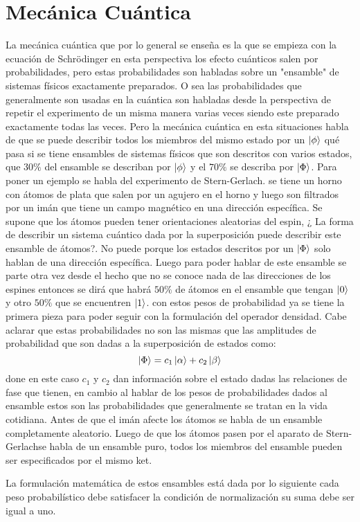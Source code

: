 \section{Mecánica Cuántica}
La mecánica cuántica que por lo general se enseña es la que se empieza con la ecuación de Schrödinger en esta perspectiva los efecto cuánticos salen por probabilidades, pero estas probabilidades son habladas sobre un "ensamble" de sistemas físicos exactamente preparados. O sea las probabilidades que generalmente son usadas en la cuántica son habladas desde la perspectiva de repetir el experimento de un misma manera varias veces siendo este preparado exactamente todas las veces. Pero la mecánica cuántica en esta situaciones habla de que se puede describir todos los miembros del mismo estado por un $\ket{\phi}$ qué pasa si se tiene ensambles de sistemas físicos que son descritos con varios estados, que $30 \% $ del ensamble se describan por $\ket{\phi}$ y el $70 \% $ se describa por $\ket{\Phi}$. 
Para poner un ejemplo se habla del experimento de Stern-Gerlach. se tiene un horno con átomos de plata que salen por un agujero en el horno y luego son filtrados por un imán que tiene un campo magnético en una dirección específica. Se supone que los átomos pueden tener orientaciones aleatorias del espin, ¿ La forma de describir un sistema cuántico dada por la superposición puede describir este ensamble de átomos?. No puede porque los estados descritos por un $\ket{\Phi}$ solo hablan de una dirección específica. Luego para poder hablar de este ensamble se parte otra vez desde el hecho que no se conoce nada de las direcciones de los espines entonces se dirá que habrá $50 \% $ de átomos en el ensamble que tengan $\ket{0}$ y otro $50 \% $ que se encuentren $\ket{1}$. con estos pesos de probabilidad ya se tiene la primera pieza para poder seguir con la formulación del operador densidad. Cabe aclarar que estas probabilidades no son las mismas que las amplitudes de probabilidad que son dadas a la superposición de estados como:
\begin{equation}
\ket{\Phi}=c_{1}\ket{\alpha}+ c_{2}\ket{\beta}
\end{equation}
done en este caso $c_{1}$ y $c_{2}$ dan información sobre el estado dadas las relaciones de fase que tienen, en cambio al hablar de los pesos de probabilidades dados al ensamble estos son las probabilidades que generalmente se tratan en la vida cotidiana. Antes de que el imán afecte los átomos se habla de un ensamble completamente aleatorio. Luego de que los átomos pasen por el aparato de Stern-Gerlachse habla de un ensamble puro, todos los miembros del ensamble pueden ser especificados por el mismo ket.

La formulación matemática de estos ensambles está dada por lo siguiente cada peso probabilístico debe satisfacer la condición de normalización su suma debe ser igual a uno.

